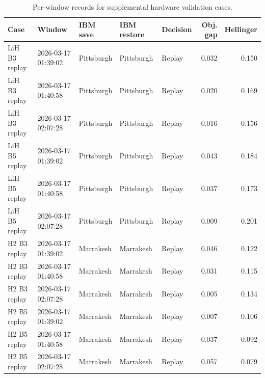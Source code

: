\begin{table}[t]
\centering
{}
\begin{tabular}{lllllrr}
\toprule
Case & Window & IBM save & IBM restore & Decision & Obj. gap & Hellinger \\
\midrule
LiH B3 replay & 2026-03-17 01:39:02 & Pittsburgh & Pittsburgh & Replay & 0.032 & 0.150 \\
LiH B3 replay & 2026-03-17 01:40:58 & Pittsburgh & Pittsburgh & Replay & 0.020 & 0.169 \\
LiH B3 replay & 2026-03-17 02:07:28 & Pittsburgh & Pittsburgh & Replay & 0.016 & 0.156 \\
LiH B5 replay & 2026-03-17 01:39:02 & Pittsburgh & Pittsburgh & Replay & 0.043 & 0.184 \\
LiH B5 replay & 2026-03-17 01:40:58 & Pittsburgh & Pittsburgh & Replay & 0.037 & 0.173 \\
LiH B5 replay & 2026-03-17 02:07:28 & Pittsburgh & Pittsburgh & Replay & 0.009 & 0.201 \\
H2 B3 replay & 2026-03-17 01:39:02 & Marrakesh & Marrakesh & Replay & 0.046 & 0.122 \\
H2 B3 replay & 2026-03-17 01:40:58 & Marrakesh & Marrakesh & Replay & 0.031 & 0.115 \\
H2 B3 replay & 2026-03-17 02:07:28 & Marrakesh & Marrakesh & Replay & 0.005 & 0.134 \\
H2 B5 replay & 2026-03-17 01:39:02 & Marrakesh & Marrakesh & Replay & 0.007 & 0.106 \\
H2 B5 replay & 2026-03-17 01:40:58 & Marrakesh & Marrakesh & Replay & 0.037 & 0.092 \\
H2 B5 replay & 2026-03-17 02:07:28 & Marrakesh & Marrakesh & Replay & 0.057 & 0.079 \\
\bottomrule
\end{tabular}
\caption{Per-window records for supplemental hardware validation cases.}
\label{tab:supplemental\_hw\_window\_records}
\end{table}
